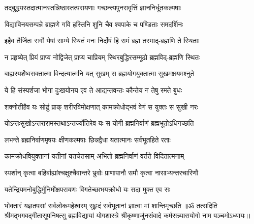 \twolineshloka
{तद्बुद्धयस्तदात्मानस्तन्निष्ठास्तत्परायणाः}
{गच्छन्त्यपुनरावृत्तिं ज्ञाननिर्धूतकल्मषाः}%

\twolineshloka
{विद्याविनयसम्पन्ने ब्राह्मणे गवि हस्तिनि}
{शुनि चैव श्वपाके च पण्डिताः समदर्शिनः}%

\twolineshloka
{इहैव तैर्जितः सर्गो येषां साम्ये स्थितं मनः}
{निर्दोषं हि समं ब्रह्म तस्माद्-ब्रह्मणि ते स्थिताः}%

\twolineshloka
{न प्रहृष्येत् प्रियं प्राप्य नोद्विजेत् प्राप्य चाप्रियम्}
{स्थिरबुद्धिरसम्मूढो ब्रह्मविद्-ब्रह्मणि स्थितः}%

\twolineshloka
{बाह्यस्पर्शेष्वसक्तात्मा विन्दत्यात्मनि यत् सुखम्}
{स ब्रह्मयोगयुक्तात्मा सुखमक्षयमश्नुते}%

\twolineshloka
{ये हि संस्पर्शजा भोगा दुःखयोनय एव ते}
{आद्यन्तवन्तः कौन्तेय न तेषु रमते बुधः}%

\twolineshloka
{शक्नोतीहैव यः सोढुं प्राक् शरीरविमोक्षणात्}
{कामक्रोधोद्भवं वेगं स युक्तः स सुखी नरः}%

\twolineshloka
{योऽन्तःसुखोऽन्तरारामस्तथाऽन्तर्ज्योतिरेव यः}
{स योगी ब्रह्मनिर्वाणं ब्रह्मभूतोऽधिगच्छति}%

\twolineshloka
{लभन्ते ब्रह्मनिर्वाणमृषयः क्षीणकल्मषाः}
{छिन्नद्वैधा यतात्मानः सर्वभूतहिते रताः}%

\twolineshloka
{कामक्रोधवियुक्तानां यतीनां यतचेतसाम्}
{अभितो ब्रह्मनिर्वाणं वर्तते विदितात्मनाम्}%

\twolineshloka
{स्पर्शान् कृत्वा बहिर्बाह्यांश्चक्षुश्चैवान्तरे भ्रुवोः}
{प्राणापानौ समौ कृत्वा नासाभ्यन्तरचारिणौ}%

\twolineshloka
{यतेन्द्रियमनोबुद्धिर्मुनिर्मोक्षपरायणः}
{विगतेच्छाभयक्रोधो यः सदा मुक्त एव सः}%

\twolineshloka
{भोक्तारं यज्ञतपसां सर्वलोकमहेश्वरम्}
{सुहृदं सर्वभूतानां ज्ञात्वा मां शान्तिमृच्छति}%
{॥ॐ तत्सदिति श्रीमद्भगवद्गीतासूपनिषत्सु ब्रह्मविद्यायां योगशास्त्रे श्रीकृष्णार्जुनसंवादे कर्मसन्न्यासयोगो नाम पञ्चमोऽध्यायः॥}